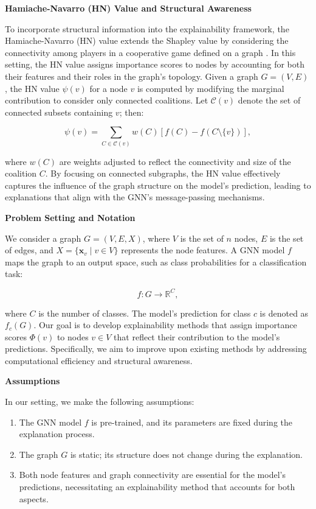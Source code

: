 \documentclass{article}
\begin{document}
\textbf{Hamiache-Navarro (HN) Value and Structural Awareness}

To incorporate structural information into the explainability framework, the Hamiache-Navarro (HN) value extends the Shapley value by considering the connectivity among players in a cooperative game defined on a graph \cite{arXiv:2201.12380v5}. In this setting, the HN value assigns importance scores to nodes by accounting for both their features and their roles in the graph's topology. Given a graph $G = (V, E)$, the HN value $\psi(v)$ for a node $v$ is computed by modifying the marginal contribution to consider only connected coalitions. Let $\mathcal{C}(v)$ denote the set of connected subsets containing $v$; then:

\[
\psi(v) = \sum_{C \in \mathcal{C}(v)} w(C) \left[ f(C) - f(C \setminus \{v\}) \right],
\]

where $w(C)$ are weights adjusted to reflect the connectivity and size of the coalition $C$. By focusing on connected subgraphs, the HN value effectively captures the influence of the graph structure on the model's prediction, leading to explanations that align with the GNN's message-passing mechanisms.

\textbf{Problem Setting and Notation}

We consider a graph $G = (V, E, X)$, where $V$ is the set of $n$ nodes, $E$ is the set of edges, and $X = \{\mathbf{x}_v \mid v \in V\}$ represents the node features. A GNN model $f$ maps the graph to an output space, such as class probabilities for a classification task:

\[
f: G \rightarrow \mathbb{R}^C,
\]

where $C$ is the number of classes. The model's prediction for class $c$ is denoted as $f_c(G)$. Our goal is to develop explainability methods that assign importance scores $\Phi(v)$ to nodes $v \in V$ that reflect their contribution to the model's predictions. Specifically, we aim to improve upon existing methods by addressing computational efficiency and structural awareness.

\textbf{Assumptions}

In our setting, we make the following assumptions:

\begin{enumerate}
    \item The GNN model $f$ is pre-trained, and its parameters are fixed during the explanation process.
    \item The graph $G$ is static; its structure does not change during the explanation.
    \item Both node features and graph connectivity are essential for the model's predictions, necessitating an explainability method that accounts for both aspects.
\end{enumerate}
\end{document}
